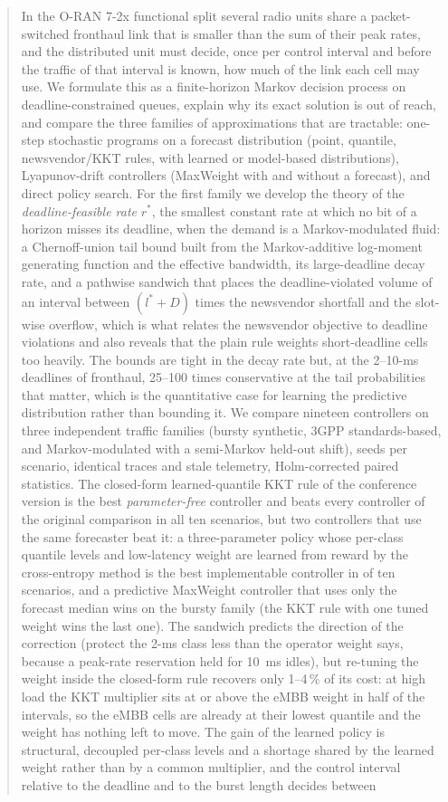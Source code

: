 \documentclass[journal]{IEEEtran}
\newcommand{\rstar}{r^{\ast}}
\begin{document}
\begin{abstract}
In the O-RAN 7-2x functional split several radio units share a packet-switched fronthaul link that is smaller than the sum of their peak rates, and the distributed unit must decide, once per control interval and before the traffic of that interval is known, how much of the link each cell may use. We formulate this as a finite-horizon Markov decision process on deadline-constrained queues, explain why its exact solution is out of reach, and compare the three families of approximations that are tractable: one-step stochastic programs on a forecast distribution (point, quantile, newsvendor/KKT rules, with learned or model-based distributions), Lyapunov-drift controllers (MaxWeight with and without a forecast), and direct policy search. For the first family we develop the theory of the \emph{deadline-feasible rate} $\rstar$, the smallest constant rate at which no bit of a horizon misses its deadline, when the demand is a Markov-modulated fluid: a Chernoff-union tail bound built from the Markov-additive log-moment generating function and the effective bandwidth, its large-deadline decay rate, and a pathwise sandwich that places the deadline-violated volume of an interval between $(l^\ast{+}D)$ times the newsvendor shortfall and the slot-wise overflow, which is what relates the newsvendor objective to deadline violations and also reveals that the plain rule weights short-deadline cells too heavily. The bounds are tight in the decay rate but, at the 2--10-ms deadlines of fronthaul, 25--100 times conservative at the tail probabilities that matter, which is the quantitative case for learning the predictive distribution rather than bounding it. We compare nineteen controllers on three independent traffic families (bursty synthetic, 3GPP standards-based, and Markov-modulated with a semi-Markov held-out shift), \xnSeedsS{} seeds per scenario, identical traces and stale telemetry, Holm-corrected paired statistics. The closed-form learned-quantile KKT rule of the conference version is the best \emph{parameter-free} controller and beats every controller of the original comparison in all ten scenarios, but two controllers that use the same forecaster beat it: a three-parameter policy whose per-class quantile levels and low-latency weight are learned from reward by the cross-entropy method is the best implementable controller in \xwinscempolicy{} of ten scenarios, and a predictive MaxWeight controller that uses only the forecast median wins \xwinspredmaxweight{} on the bursty family (the KKT rule with one tuned weight wins the last one). The sandwich predicts the direction of the correction (protect the 2-ms class less than the operator weight says, because a peak-rate reservation held for 10~ms idles), but re-tuning the weight inside the closed-form rule recovers only 1--4\,\% of its cost: at high load the KKT multiplier sits at or above the eMBB weight in half of the intervals, so the eMBB cells are already at their lowest quantile and the weight has nothing left to move. The gain of the learned policy is structural, decoupled per-class levels and a shortage shared by the learned weight rather than by a common multiplier, and the control interval relative to the deadline and to the burst length decides between 
\end{abstract}
\end{document}

